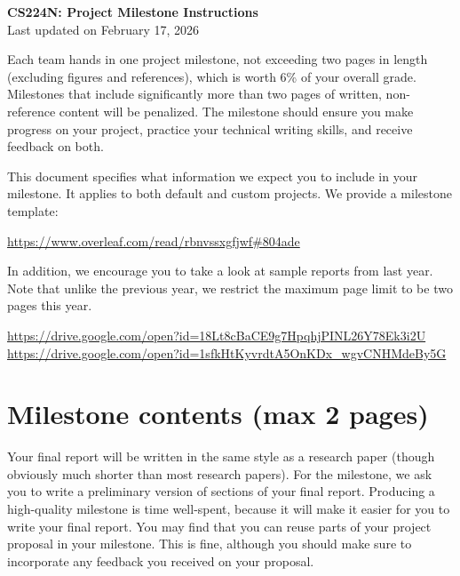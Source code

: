 \documentclass[11pt,a4paper]{article}
\begin{document}
\begin{center}
    {\LARGE \textbf{CS224N: Project Milestone Instructions}}\\[0.5em]
    Last updated on February 17, 2026
\end{center}

\bigskip

Each team hands in one project milestone, not exceeding two pages in length (excluding figures and references), which is worth 6\% of your overall grade. Milestones that include significantly more than two pages of written, non-reference content will be penalized. The milestone should ensure you make progress on your project, practice your technical writing skills, and receive feedback on both.

This document specifies what information we expect you to include in your milestone. It applies to both default and custom projects. We provide a milestone template:

\begin{center}
    \url{https://www.overleaf.com/read/rbnvssxgfjwf#804ade}
\end{center}

In addition, we encourage you to take a look at sample reports from last year. Note that unlike the previous year, we restrict the maximum page limit to be two pages this year.

\begin{center}
    \url{https://drive.google.com/open?id=18Lt8cBaCE9g7HpqhjPINL26Y78Ek3i2U}\\[0.3em]
    \url{https://drive.google.com/open?id=1sfkHtKyvrdtA5OnKDx_wgvCNHMdeBy5G}
\end{center}


\section{Milestone contents (max 2 pages)}

Your final report will be written in the same style as a research paper (though obviously much shorter than most research papers). For the milestone, we ask you to write a preliminary version of sections of your final report. Producing a high-quality milestone is time well-spent, because it will make it easier for you to write your final report. You may find that you can reuse parts of your project proposal in your milestone. This is fine, although you should make sure to incorporate any feedback you received on your proposal.
\end{document}
